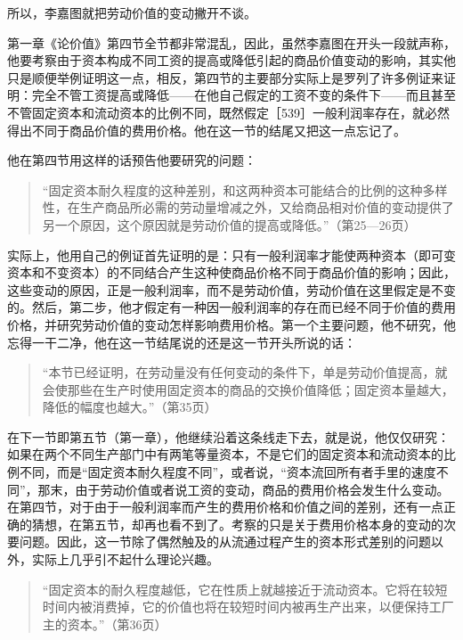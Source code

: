 所以，李嘉图就把劳动价值的变动撇开不谈。

第一章《论价值》第四节全节都非常混乱，因此，虽然李嘉图在开头一段就声称，他要考察由于资本构成不同工资的提高或降低引起的商品价值变动的影响，其实他只是顺便举例证明这一点，相反，第四节的主要部分实际上是罗列了许多例证来证明：完全不管工资提高或降低——在他自己假定的工资不变的条件下——而且甚至不管固定资本和流动资本的比例不同，既然假定［539］一般利润率存在，就必然得出不同于商品价值的费用价格。他在这一节的结尾又把这一点忘记了。

他在第四节用这样的话预告他要研究的问题：

\begin{quote}{“固定资本耐久程度的这种差别，和这两种资本可能结合的比例的这种多样性，在生产商品所必需的劳动量增减之外，又给商品相对价值的变动提供了另一个原因，这个原因就是劳动价值的提高或降低。”（第25—26页）}\end{quote}

实际上，他用自己的例证首先证明的是：只有一般利润率才能使两种资本（即可变资本和不变资本）的不同结合产生这种使商品价格不同于商品价值的影响；因此，这些变动的原因，正是一般利润率，而不是劳动价值，劳动价值在这里假定是不变的。然后，第二步，他才假定有一种因一般利润率的存在而已经不同于价值的费用价格，并研究劳动价值的变动怎样影响费用价格。第一个主要问题，他不研究，他忘得一干二净，他在这一节结尾说的还是这一节开头所说的话：

\begin{quote}{“本节已经证明，在劳动量没有任何变动的条件下，单是劳动价值提高，就会使那些在生产时使用固定资本的商品的交换价值降低；固定资本量越大，降低的幅度也越大。”（第35页）}\end{quote}

在下一节即第五节（第一章），他继续沿着这条线走下去，就是说，他仅仅研究：如果在两个不同生产部门中有两笔等量资本，不是它们的固定资本和流动资本的比例不同，而是“固定资本耐久程度不同”，或者说，“资本流回所有者手里的速度不同”，那末，由于劳动价值或者说工资的变动，商品的费用价格会发生什么变动。在第四节，对于由于一般利润率而产生的费用价格和价值之间的差别，还有一点正确的猜想，在第五节，却再也看不到了。考察的只是关于费用价格本身的变动的次要问题。因此，这一节除了偶然触及的从流通过程产生的资本形式差别的问题以外，实际上几乎引不起什么理论兴趣。

\begin{quote}{“固定资本的耐久程度越低，它在性质上就越接近于流动资本。它将在较短时间内被消费掉，它的价值也将在较短时间内被再生产出来，以便保持工厂主的资本。”（第36页）}\end{quote}

